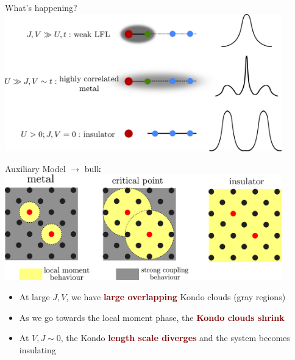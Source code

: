 \documentclass[aspectratio=169]{beamer}
\newcommand{\focus}[1]{\textcolor{maroon}{\textbf{#1}}}
\begin{document}

\begin{frame}[noframenumbering]{What's happening?}
\includegraphics[width=0.9\textwidth]{figures/sc-lm.pdf}
\end{frame}


\begin{frame}[noframenumbering]{Auxiliary Model $\rightarrow$ bulk}
\includegraphics[width=0.9\textwidth]{figures/cloud_lattice.pdf}

\begin{itemize}
	\item At large \(J,V\), we have \focus{large overlapping} Kondo clouds (gray regions)
	\item As we go towards the local moment phase, the \focus{Kondo clouds shrink}
	\item At \(V,J \sim 0\), the Kondo \focus{length scale diverges} and the system becomes insulating
\end{itemize}

\end{frame}
\end{document}
